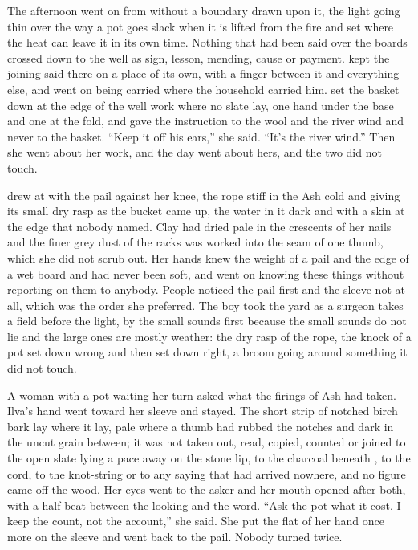 The afternoon went on from  without a boundary drawn upon it, the light going thin over  the way a pot goes slack when it is lifted from the fire and set where the heat can leave it in its own time. Nothing that had been said over the boards crossed down to the well as sign, lesson, mending, cause or payment.  kept the joining said there on a place of its own, with a finger between it and everything else, and went on being carried where the household carried him.  set the basket down at the edge of the well work where no slate lay, one hand under the base and one at the fold, and gave the instruction to the wool and the river wind and never to the basket. “Keep it off his ears,” she said. “It's the river wind.” Then she went about her work, and the day went about hers, and the two did not touch.

 drew at  with the pail against her knee, the rope stiff in the Ash cold and giving its small dry rasp as the bucket came up, the water in it dark and with a skin at the edge that nobody named. Clay had dried pale in the crescents of her nails and the finer grey dust of the racks was worked into the seam of one thumb, which she did not scrub out. Her hands knew the weight of a pail and the edge of a wet board and had never been soft, and went on knowing these things without reporting on them to anybody. People noticed the pail first and the sleeve not at all, which was the order she preferred. The boy took the yard as a surgeon takes a field before the light, by the small sounds first because the small sounds do not lie and the large ones are mostly weather: the dry rasp of the rope, the knock of a pot set down wrong and then set down right, a broom going around something it did not touch.

A woman with a pot waiting her turn asked what the firings of Ash had taken. Ilva's hand went toward her sleeve and stayed. The short strip of notched birch bark lay where it lay, pale where a thumb had rubbed the notches and dark in the uncut grain between; it was not taken out, read, copied, counted or joined to the open slate lying a pace away on the stone lip, to the charcoal beneath , to the cord, to the knot-string or to any saying that had arrived nowhere, and no figure came off the wood. Her eyes went to the asker and her mouth opened after both, with a half-beat between the looking and the word. “Ask the pot what it cost. I keep the count, not the account,” she said. She put the flat of her hand once more on the sleeve and went back to the pail. Nobody turned twice.

